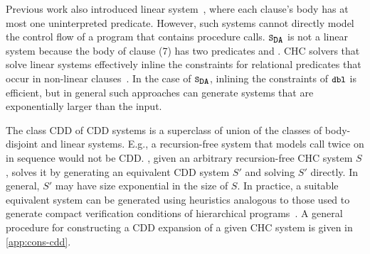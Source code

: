 Previous work also introduced linear system~\cite{albarghouthi12a},
where each clause's body has at most one uninterpreted predicate.
%
However, such systems cannot directly model the control flow of a
program that contains procedure calls.
%
$\mcchc$ is not a linear system because the body of clause (7) has two
predicates  and .
%
CHC solvers that solve linear systems effectively inline the
constraints for relational predicates that occur in non-linear
clauses~\cite{albarghouthi12b}.
%
In the case of $\mcchc$, inlining the constraints of $\cc{dbl}$ is
efficient, but in general such approaches can generate systems that
are exponentially larger than the input.

\begin{figure}
  
\end{figure}

The class CDD of CDD systems is a superclass of union of the classes of
body-disjoint and linear systems.
%
%
E.g., a recursion-free system that models  
call  twice on  in sequence would not
be CDD.
%
\sys, given an arbitrary recursion-free CHC system $S$,
solves it by generating an equivalent CDD system $S'$ and
solving $S'$ directly.
%
In general, $S'$ may have size exponential in the size of
$S$.
%
In practice, a suitable equivalent system can be generated using
heuristics analogous to those used to generate compact verification
conditions of hierarchical programs~\cite{flanagan01,lal-qadeer15}.
%
A general procedure for constructing a CDD expansion of a given CHC
system is given in \autoref{app:cons-cdd}.

